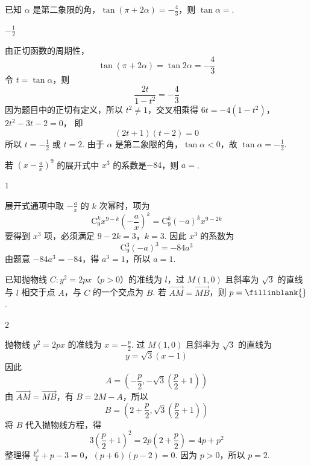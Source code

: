 \begin{problem}
已知 \(\alpha\) 是第二象限的角，\(\tan\left(\pi + 2\alpha\right) = -\frac{4}{3}\)，则 \(\tan\alpha =\)\fillinblank{}.
\end{problem}

\begin{answer}
\(-\frac{1}{2}\)
\end{answer}

\begin{solution}
由正切函数的周期性，
\[
\tan(\pi+2\alpha)=\tan2\alpha=-\frac43
\]
令 \(t=\tan\alpha\)，则
\[
\frac{2t}{1-t^2}=-\frac43
\]
因为题目中的正切有定义，所以 \(t^2\ne1\)，交叉相乘得
\(6t=-4(1-t^2)\)，\(2t^2-3t-2=0\)，
即
\[
(2t+1)(t-2)=0
\]
所以 \(t=-\frac12\) 或 \(t=2\). 由于 \(\alpha\) 是第二象限的角，\(\tan\alpha<0\)，故 \(\tan\alpha=-\frac12\).
\end{solution}

\begin{problem}
若 \(\left(x - \frac{a}{x}\right)^9\) 的展开式中 \(x^3\) 的系数是\(-84\)，则 \(a =\)\fillinblank{}.
\end{problem}

\begin{answer}
\(1\)
\end{answer}

\begin{solution}
展开式通项中取 \(-\frac{a}{x}\) 的 \(k\) 次幂时，项为
\[
\mathrm C_9^k x^{9-k}\left(-\frac{a}{x}\right)^k
=\mathrm C_9^k(-a)^k x^{9-2k}
\]
要得到 \(x^3\) 项，必须满足
\(9-2k=3\)，\(k=3\).
因此 \(x^3\) 的系数为
\[
\mathrm C_9^3(-a)^3=-84a^3
\]
由题意 \(-84a^3=-84\)，得 \(a^3=1\)，所以 \(a=1\).
\end{solution}

\begin{problem}
已知抛物线 \(C: y^2 = 2px\)（\(p > 0\)）的准线为 \(l\)，过 \(M(1,0)\) 且斜率为 \(\sqrt{3}\) 的直线与 \(l\) 相交于点 \(A\)，与 \(C\) 的一个交点为 \(B\). 若 \(\overrightarrow{AM} = \overrightarrow{MB}\)，则 \(p =\fillinblank{}\).
\end{problem}

\begin{answer}
\(2\)
\end{answer}

\begin{solution}
抛物线 \(y^2=2px\) 的准线为 \(x=-\frac{p}{2}\). 过 \(M(1,0)\) 且斜率为 \(\sqrt3\) 的直线为
\[
y=\sqrt3(x-1)
\]
因此
\[
A=\left(-\frac p2,-\sqrt3\left(\frac p2+1\right)\right)
\]
由 \(\overrightarrow{AM}=\overrightarrow{MB}\)，有 \(B=2M-A\)，所以
\[
B=\left(2+\frac p2,\sqrt3\left(\frac p2+1\right)\right)
\]
将 \(B\) 代入抛物线方程，得
\[
3\left(\frac p2+1\right)^2=2p\left(2+\frac p2\right)=4p+p^2
\]
整理得
\(\frac{p^2}{4}+p-3=0\)，\((p+6)(p-2)=0\).
因为 \(p>0\)，所以 \(p=2\).
\end{solution}

